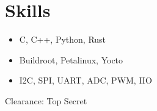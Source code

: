 \section*{Skills}
\begin{itemize}[itemsep=-0.5em]
    \item C, C++, Python, Rust
    \item Buildroot, Petalinux, Yocto
    \item I2C, SPI, UART, ADC, PWM, IIO
\end{itemize}
\noindent Clearance: Top Secret \par
